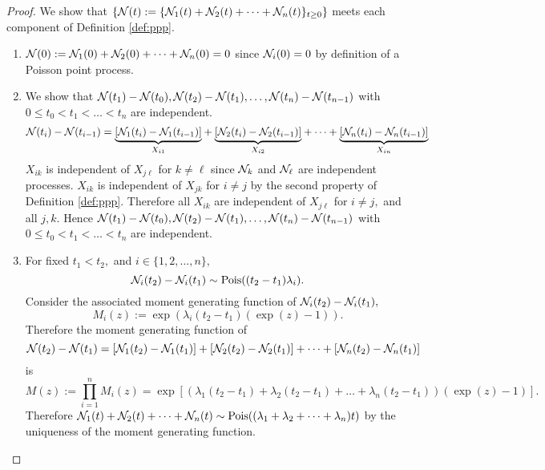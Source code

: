 \begin{proof}
    We show that
    $\{\mathcal{N}(t) := \{\mathcal{N}_1(t) + \mathcal{N}_2(t) + \dots + \mathcal{N}_n(t)\}_{t\geq0}\}$ meets each
    component of Definition \ref{def:ppp}.
    \begin{enumerate}
        \item $\mathcal{N}(0) := \mathcal{N}_1(0) + \mathcal{N}_2(0) + \dots + \mathcal{N}_n(0) = 0$ since
              $\mathcal{N}_i(0) = 0$ by definition of a Poisson point process.
        \item We show that $\mathcal{N}(t_1) - \mathcal{N}(t_0), \mathcal{N}(t_2) - \mathcal{N}(t_1), \dots,
                  \mathcal{N}(t_n) - \mathcal{N}(t_{n - 1})$
              with $0 \leq t_0 < t_1 < \dots < t_n$ are independent.
              $$\mathcal{N}(t_i) - \mathcal{N}(t_{i - 1})
                  = \underset{X_{i1}}
                  {\underbrace{[\mathcal{N}_1(t_i) - \mathcal{N}_1(t_{i - 1})]}}
                  + \underset{X_{i2}}
                  {\underbrace{[\mathcal{N}_2(t_i) - \mathcal{N}_2(t_{i - 1})]}} + \dots
                  + \underset{X_{in}}
                  {\underbrace{[\mathcal{N}_n(t_i) - \mathcal{N}_n(t_{i - 1})]}}$$
              $X_{ik}$ is independent of $X_{j\ell}$ for $k \neq \ell$ since
              $\mathcal{N}_k$ and $\mathcal{N}_\ell$ are independent processes. $X_{ik}$ is
              independent of $X_{jk}$ for $i\neq j$ by the second property
              of Definition \ref{def:ppp}. Therefore all $X_{ik}$ are
              independent of $X_{j\ell}$ for $i\neq j,$ and all $j, k.$
              Hence
              $\mathcal{N}(t_1) - \mathcal{N}(t_0), \mathcal{N}(t_2) - \mathcal{N}(t_1), \dots,
                  \mathcal{N}(t_n) - \mathcal{N}(t_{n - 1})$
              with $0 \leq t_0 < t_1 < \dots < t_n$ are independent.
        \item For fixed $t_1 < t_2,$ and $i \in \{1, 2, \dots, n\},$
              $$\mathcal{N}_i(t_2) - \mathcal{N}_i(t_1) \sim \operatorname{Pois}((t_2 - t_1)\lambda_i).$$
              Consider the associated moment generating function of
              $\mathcal{N}_i(t_2) - \mathcal{N}_i(t_1),$
              $$M_i(z) := \exp(\lambda_i(t_2 - t_1)(\exp(z) - 1)).$$
              Therefore the moment generating function of
              $$\mathcal{N}(t_2) - \mathcal{N}(t_1) =
                  [\mathcal{N}_1(t_2) - \mathcal{N}_1(t_1)] + [\mathcal{N}_2(t_2) - \mathcal{N}_2(t_1)] + \dots
                  + [\mathcal{N}_n(t_2) - \mathcal{N}_n(t_1)]$$ is
              $$ M(z) := \prod_{i = 1}^n M_i(z) =
                  \exp[
                      (\lambda_1 (t_2 - t_1) + \lambda_2 (t_2 - t_1) + \dots
                      + \lambda_n (t_2 - t_1))
                      (\exp(z) - 1)
                  ].$$
              Therefore
              $\mathcal{N}_1(t) + \mathcal{N}_2(t) + \dots + \mathcal{N}_n(t) \sim
                  \operatorname{Pois}((\lambda_1 + \lambda_2 + \dots + \lambda_n) t)$
              by the uniqueness of the moment generating function.
    \end{enumerate}
\end{proof}

